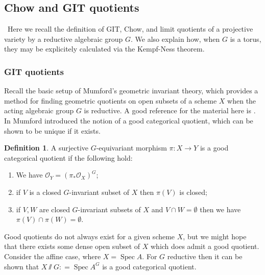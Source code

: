 \documentclass{amsart}
\theoremstyle{definition}
\newtheorem{definition}[theorem]{Definition}
\DeclareMathOperator{\spec}{Spec}
\begin{document}
\subsection{Chow and GIT quotients} \
Here we recall the definition of GIT, Chow, and limit quotients of a projective variety by a reductive algebraic group \(G\). We also explain how, when \(G\) is a torus, they may be explicitely calculated via the Kempf-Ness theorem.
\subsubsection{GIT quotients}
Recall the basic setup of Mumford's geometric invariant theory, which provides a method for finding geometric quotients on open subsets of a scheme \(X\) when the acting algebraic group \(G\) is reductive. A good reference for the material here is \cite{mumford1994}.
%
%
%
In \cite{mumford1994} Mumford introduced the notion of a good categorical quotient, which can be shown to be unique if it exists.
%
%
%
\begin{definition}
A surjective \(G\)-equivariant morphism \(\pi : X \to Y\) is a good categorical quotient if the following hold:
\begin{enumerate}
\item We have \(\mathcal{O}_Y = (\pi_* \mathcal{O}_X)^G\);
\item if \(V\) is a closed \(G\)-invariant subset of \(X\) then \(\pi(V)\) is closed;
\item if \(V,W\) are closed \(G\)-invariant subsets of \(X\) and \(V \cap W = \emptyset\) then we have \(\pi(V) \cap \pi(W) = \emptyset\).
\end{enumerate}
\end{definition}
%
%
%
Good quotients do not always exist for a given scheme \(X\), but we might hope that there exists some dense open subset of \(X\) which does admit a good quotient. Consider the affine case, where \(X = \spec A\). For \(G\) reductive then it can be shown that \(X \sslash G : = \spec A^G\) is a good categorical quotient.
\end{document}
